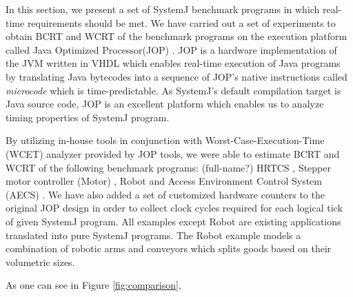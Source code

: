 %
In this section, we present a set of SystemJ benchmark programs in which
real-time requirements should be met.
We have carried out a set of experiments to obtain BCRT and WCRT of the
benchmark programs on the execution platform called Java Optimized
Processor(JOP) \cite{jop:jnl:jsa2007}. JOP is a hardware implementation of the
JVM written in VHDL which enables real-time execution of Java programs by
translating Java bytecodes into a sequence of JOP's native instructions called
\emph{microcode} which is time-predictable. As SystemJ's default compilation
target is Java source code, JOP is an excellent platform which enables us to
analyze timing properties of SystemJ program.


By utilizing in-house tools in conjunction with Worst-Case-Execution-Time (WCET)
analyzer \cite{jop:jnl:jsa2007} provided by JOP tools, we were able to estimate
BCRT and WCRT of the following benchmark programs: (full-name?) HRTCS \cite{},
Stepper motor controller (Motor) \cite{}, Robot and Access Environment Control
System (AECS) \cite{}. We have also added a set of customized hardware counters
to the original JOP design in order to collect clock cycles required for each
logical tick of given SystemJ program. All examples except Robot are existing
applications translated into pure SystemJ programs. The Robot example models a
combination of robotic arms and conveyors which splits goods based on their
volumetric sizes.

As one can see in Figure \ref{fig:comparison}, 




